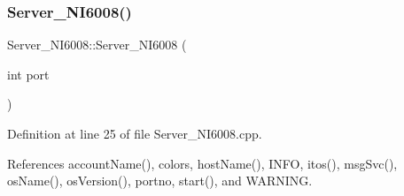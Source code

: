 \subsubsection{\texorpdfstring{Server\+\_\+\+N\+I6008()}{Server\_NI6008()}}
{\footnotesize\ttfamily Server\+\_\+\+N\+I6008\+::\+Server\+\_\+\+N\+I6008 (\begin{DoxyParamCaption}\item[{int}]{port }\end{DoxyParamCaption})}



Definition at line 25 of file Server\+\_\+\+N\+I6008.\+cpp.



References account\+Name(), colors, host\+Name(), I\+N\+FO, itos(), msg\+Svc(), os\+Name(), os\+Version(), portno, start(), and W\+A\+R\+N\+I\+NG.


